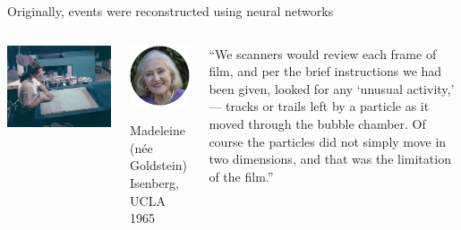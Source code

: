 \documentclass[aspectratio=169]{beamer}
\begin{document}
\begin{frame}{Originally, events were reconstructed using neural networks}
\vspace{0.25 cm}
\begin{columns}
\includegraphics[width=\linewidth]{PLOTS/scanner-alvarez-lab-2.jpg}


\vspace{-1 cm}
\begin{center}
\includegraphics[width=0.5\linewidth]{PLOTS/madeleine-isenberg-SCANNER.png}

\scriptsize
Madeleine (n\'ee Goldstein) Isenberg, UCLA 1965
\end{center}

\begin{minipage}{\linewidth}
\scriptsize
``We scanners would review each frame of film, and per the brief instructions we had been given, looked for any `unusual activity,' --- tracks or trails left by a particle as it moved through the bubble chamber. Of course the particles did not simply move in two dimensions, and that was the limitation of the film.''


\end{minipage}
\end{columns}
\end{frame}
\end{document}
